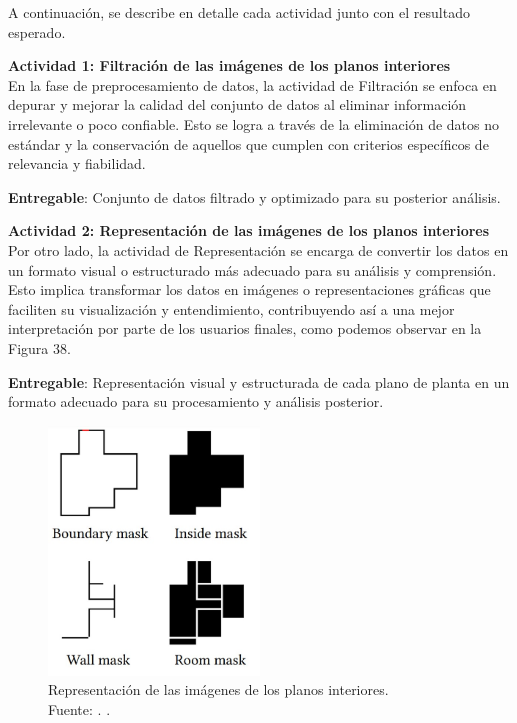 A continuación, se describe en detalle cada actividad junto con el resultado esperado.

\textbf{Actividad 1: Filtración de las imágenes de los planos interiores}
\\
En la fase de preprocesamiento de datos, la actividad de Filtración se enfoca en depurar y mejorar la calidad del conjunto de datos al eliminar información irrelevante o poco confiable. Esto se logra a través de la eliminación de datos no estándar y la conservación de aquellos que cumplen con criterios específicos de relevancia y fiabilidad. 

\textbf{Entregable}: Conjunto de datos filtrado y optimizado para su posterior análisis.

\textbf{Actividad 2: Representación de las imágenes de los planos interiores}
\\
Por otro lado, la actividad de Representación se encarga de convertir los datos en un formato visual o estructurado más adecuado para su análisis y comprensión. Esto implica transformar los datos en imágenes o representaciones gráficas que faciliten su visualización y entendimiento, contribuyendo así a una mejor interpretación por parte de los usuarios finales, como podemos observar en la Figura 38.

\textbf{Entregable}: Representación visual y estructurada de cada plano de planta en un formato adecuado para su procesamiento y análisis posterior.

\begin{figure}[h]
    \begin{center}
        \includegraphics[width=0.5\textwidth]{3/figures/Representacion_planos.jpg}
        \caption[Representación de las imágenes de los planos interiores]{Representación de las imágenes de los planos interiores.\\
        Fuente: \cite{art_wu2019interior}. .}
        \label{3:fig3}
    \end{center}
\end{figure}

